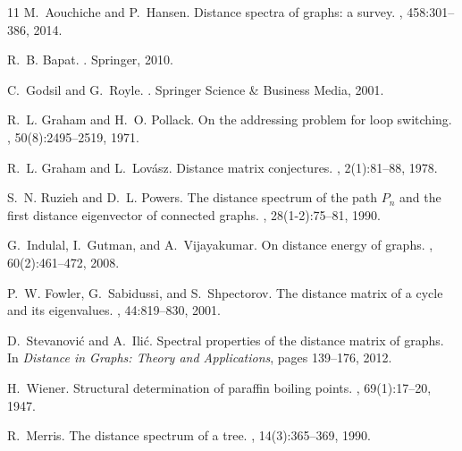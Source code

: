 \documentclass[12pt,a4paper]{article}
\begin{document}
\begin{thebibliography}{11}
  M.~Aouchiche and P.~Hansen.
  \newblock Distance spectra of graphs: a survey.
  , 458:301--386, 2014.

  R.~B. Bapat.
  .
  \newblock Springer, 2010.

  C.~Godsil and G.~Royle.
  .
  \newblock Springer Science \& Business Media, 2001.

  R.~L. Graham and H.~O. Pollack.
  \newblock On the addressing problem for loop switching.
  , 50(8):2495--2519, 1971.

  R.~L. Graham and L.~Lov{\'a}sz.
  \newblock Distance matrix conjectures.
  , 2(1):81--88, 1978.

  S.~N. Ruzieh and D.~L. Powers.
  \newblock The distance spectrum of the path $P_n$ and the first distance eigenvector of connected graphs.
  , 28(1-2):75--81, 1990.

  G.~Indulal, I.~Gutman, and A.~Vijayakumar.
  \newblock On distance energy of graphs.
  , 60(2):461--472, 2008.

  P.~W. Fowler, G.~Sabidussi, and S.~Shpectorov.
  \newblock The distance matrix of a cycle and its eigenvalues.
  , 44:819--830, 2001.

  D.~Stevanovi{\'c} and A.~Ili{\'c}.
  \newblock Spectral properties of the distance matrix of graphs.
  \newblock In {\em Distance in Graphs: Theory and Applications}, pages 139--176, 2012.

  H.~Wiener.
  \newblock Structural determination of paraffin boiling points.
  , 69(1):17--20, 1947.

  R.~Merris.
  \newblock The distance spectrum of a tree.
  , 14(3):365--369, 1990.
\end{thebibliography}
\end{document}
